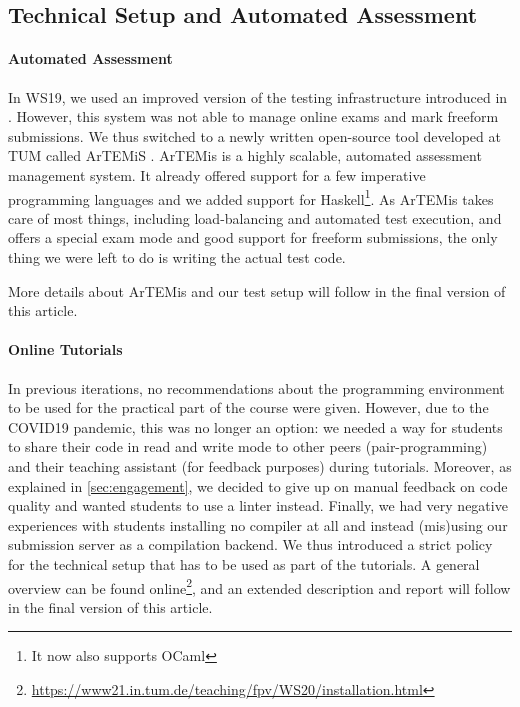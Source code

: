 \subsection{Technical Setup and Automated Assessment}\label{sec:tech_setup_test}

\paragraph{Automated Assessment}
In WS19, we used an improved version of
the testing infrastructure introduced in \cite{next_1100}.
However, this system was not able to manage online exams and mark freeform submissions.
We thus switched to a newly written open-source
tool developed at TUM called ArTEMiS \cite{artemis}.
ArTEMis is a highly scalable, automated assessment management system.
It already offered support for a few imperative programming languages
and we added support for Haskell\footnote{It now also supports OCaml}.
As ArTEMis takes care of most things,
including load-balancing and automated test execution,
and offers a special exam mode and good support for freeform submissions,
the only thing we were left to do is writing the actual test code.

More details about ArTEMis and our test setup will follow
in the final version of this article.

\paragraph{Online Tutorials}
In previous iterations,
no recommendations about the programming environment to be used for the practical part of the course
were given.
However, due to the COVID19 pandemic,
this was no longer an option:
we needed a way for students to share their code in read and write mode
to other peers (pair-programming) and their teaching assistant (for feedback purposes) during tutorials.
Moreover, as explained in \cref{sec:engagement},
we decided to give up on manual feedback on code quality
and wanted students to use a linter instead.
Finally, we had very negative experiences with students
installing no compiler at all
and instead (mis)using our submission server as a compilation backend.
We thus introduced a strict policy
for the technical setup that has to be used as part of
the tutorials.
A general overview can be found online\footnote{\url{https://www21.in.tum.de/teaching/fpv/WS20/installation.html}},
and an extended description and report will follow in the final version of this article.

